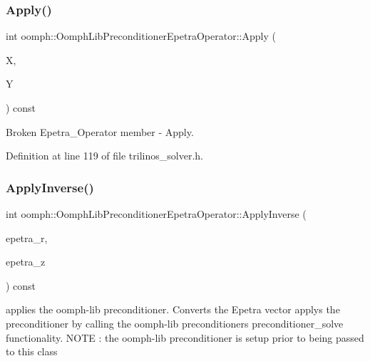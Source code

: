 \subsubsection{\texorpdfstring{Apply()}{Apply()}}
{\footnotesize\ttfamily int oomph\+::\+Oomph\+Lib\+Preconditioner\+Epetra\+Operator\+::\+Apply (\begin{DoxyParamCaption}\item[{const Epetra\+\_\+\+Multi\+Vector \&}]{X,  }\item[{Epetra\+\_\+\+Multi\+Vector \&}]{Y }\end{DoxyParamCaption}) const\hspace{0.3cm}{\ttfamily [inline]}}



Broken Epetra\+\_\+\+Operator member -\/ Apply. 



Definition at line 119 of file trilinos\+\_\+solver.\+h.

\mbox{\label{classoomph_1_1OomphLibPreconditionerEpetraOperator_a6272811acfd9ad5b70e1d30447e0742b}} 
\subsubsection{\texorpdfstring{Apply\+Inverse()}{ApplyInverse()}}
{\footnotesize\ttfamily int oomph\+::\+Oomph\+Lib\+Preconditioner\+Epetra\+Operator\+::\+Apply\+Inverse (\begin{DoxyParamCaption}\item[{const Epetra\+\_\+\+Multi\+Vector \&}]{epetra\+\_\+r,  }\item[{Epetra\+\_\+\+Multi\+Vector \&}]{epetra\+\_\+z }\end{DoxyParamCaption}) const\hspace{0.3cm}{\ttfamily [inline]}}



applies the oomph-\/lib preconditioner. Converts the Epetra vector applys the preconditioner by calling the oomph-\/lib preconditioner\textquotesingle{}s preconditioner\+\_\+solve functionality. N\+O\+TE \+: the oomph-\/lib preconditioner is setup prior to being passed to this class 



